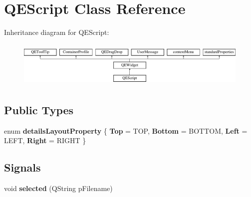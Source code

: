 \hypertarget{classQEScript}{
\section{QEScript Class Reference}
\label{classQEScript}
}
Inheritance diagram for QEScript:\begin{figure}[H]
\begin{center}
\leavevmode
\includegraphics[height=2.204725cm]{classQEScript}
\end{center}
\end{figure}
\subsection*{Public Types}
\begin{DoxyCompactItemize}
\item 
enum {\bfseries detailsLayoutProperty} \{ {\bfseries Top} =  TOP, 
{\bfseries Bottom} =  BOTTOM, 
{\bfseries Left} =  LEFT, 
{\bfseries Right} =  RIGHT
 \}
\end{DoxyCompactItemize}
\subsection*{Signals}
\begin{DoxyCompactItemize}
\item 
\hypertarget{classQEScript_a43d5322960b0c9fccdcf019cf99ea928}{
void {\bfseries selected} (QString pFilename)}
\label{classQEScript_a43d5322960b0c9fccdcf019cf99ea928}

\end{DoxyCompactItemize}
